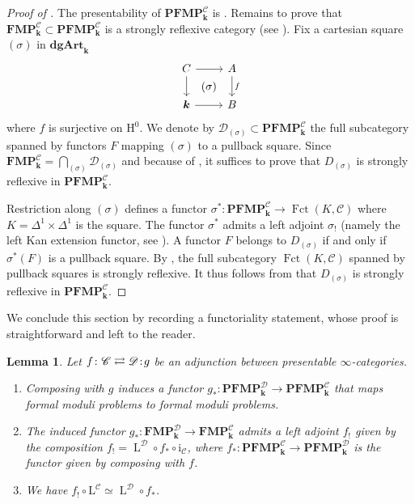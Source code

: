 \documentclass[JEP,XML,SOM,Unicode,NoEqCountersInSection]{cedram}
\let\mathcal\mathscr
\let\autoref\Cref
\newtheorem{lem}[thm]{Lemma}
\theoremstyle{definition}
\newcommand{\noloc}{\mathchoice{\,:}{\!:\!}{:}{:}}
\newcommand{\Cc}{\mathcal{C}}
\newcommand{\Dd}{\mathcal{D}}
\newcommand{\dgArt}{\mathbf{dgArt}}
\DeclareMathOperator{\Fct}{Fct}
\newcommand{\homol}{\mathrm H}
\newcommand{\FMP}{\mathbf{FMP}}
\renewcommand{\k}{{\boldsymbol{k}}}
\newcommand{\iC}{\operatorname{i_\Cc}}
\newcommand{\form}{\operatorname{L}}
\newcommand{\LC}{\operatorname{L^\Cc}}
\newcommand{\PFMP}{\mathbf{PFMP}}
\begin{document}
\begin{proof}[Proof of \autoref{lem:iCleftadjoint}]
The presentability of $\PFMP_\k^\Cc$ is \cite[5.5.3.6]{lurie:htt}.
Remains to prove that $\FMP_\k^\Cc \subset \PFMP_\k^\Cc$ is a strongly reflexive category (see \cite[p.\,482]{lurie:htt}).
Fix a cartesian square $(\sigma)$ in $\dgArt_\k$\vspace*{-5pt}\enlargethispage{\baselineskip}%
\[
\begin{tikzcd}
C \ar[r] \ar[d] & A \ar[d, "f"] \\ \k \ar[r] & B \ar[ul, phantom, "\displaystyle (\sigma)"]
\end{tikzcd}
\]
where $f$ is surjective on $\homol^0$. We denote by $\Dd_{(\sigma)} \subset \PFMP_\k^\Cc$ the full subcategory spanned by functors $F$ mapping $(\sigma)$ to a pullback square.
Since $\FMP_\k^\Cc = \bigcap_{(\sigma)} \Dd_{(\sigma)}$ and because of \cite[5.5.4.18]{lurie:htt}, it suffices to prove that $D_{(\sigma)}$ is strongly reflexive in $\PFMP_\k^\Cc$.

Restriction along $(\sigma)$ defines a functor $\sigma^* \colon \PFMP_\k^{\Cc} \to \Fct(K,\Cc)$ where $K = \Delta^1 \times \Delta^1$ is the square.
The functor $\sigma^*$ admits a left adjoint $\sigma_!$ (namely the left Kan extension functor, see \cite[4.3.3.7]{lurie:htt}). A functor $F$ belongs to $D_{(\sigma)}$ if and only if $\sigma^*(F)$ is a pullback square. By \cite[5.5.4.19]{lurie:htt}, the full subcategory $\Fct(K,\Cc)$ spanned by pullback squares is strongly reflexive. It thus follows from \cite[5.5.4.17]{lurie:htt} that $D_{(\sigma)}$ is strongly reflexive in $\PFMP^\Cc_\k$.
\end{proof}

We conclude this section by recording a functoriality statement, whose proof is straightforward and left to the reader.

\begin{lem}\label{lem:functoriality}
Let $f \colon \Cc \rightleftarrows \Dd \noloc g$ be an adjunction between presentable $\infty$\nobreakdash-cate\-gories.
\begin{enumerate}
\item Composing with $g$ induces a functor $g_* \colon \PFMP_\k^\Dd \to \PFMP_\k^\Cc$ that maps formal moduli problems to formal moduli problems.
\item The induced functor $g_* \colon \FMP_\k^\Dd \to \FMP_\k^\Cc$ admits a left adjoint $f_!$ given by the composition $f_! = \form^\Dd \circ f_* \circ \iC$, where $f_* \colon \PFMP_\k^\Cc \to \PFMP_\k^\Dd$ is the functor given by composing with $f$.
\item We have $f_! \circ \LC \simeq \form^\Dd \circ f_*$.
\end{enumerate}
\end{lem}
\end{document}
